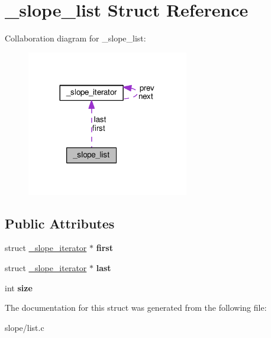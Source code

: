\hypertarget{struct__slope__list}{\section{\+\_\+slope\+\_\+list Struct Reference}
\label{struct__slope__list}
}


Collaboration diagram for \+\_\+slope\+\_\+list\+:
\nopagebreak
\begin{figure}[H]
\begin{center}
\leavevmode
\includegraphics[width=200pt]{struct__slope__list__coll__graph}
\end{center}
\end{figure}
\subsection*{Public Attributes}
\begin{DoxyCompactItemize}
\item 
\hypertarget{struct__slope__list_ae4755b2ce5e8e2894fd42f99a803b6ee}{struct \hyperlink{struct__slope__iterator}{\+\_\+slope\+\_\+iterator} $\ast$ {\bfseries first}}\label{struct__slope__list_ae4755b2ce5e8e2894fd42f99a803b6ee}

\item 
\hypertarget{struct__slope__list_a83a3ca98c4f39466fec5a1caf37c975b}{struct \hyperlink{struct__slope__iterator}{\+\_\+slope\+\_\+iterator} $\ast$ {\bfseries last}}\label{struct__slope__list_a83a3ca98c4f39466fec5a1caf37c975b}

\item 
\hypertarget{struct__slope__list_a36ba8b99c1187709b8c489815bea4413}{int {\bfseries size}}\label{struct__slope__list_a36ba8b99c1187709b8c489815bea4413}

\end{DoxyCompactItemize}


The documentation for this struct was generated from the following file\+:\begin{DoxyCompactItemize}
\item 
slope/list.\+c\end{DoxyCompactItemize}

